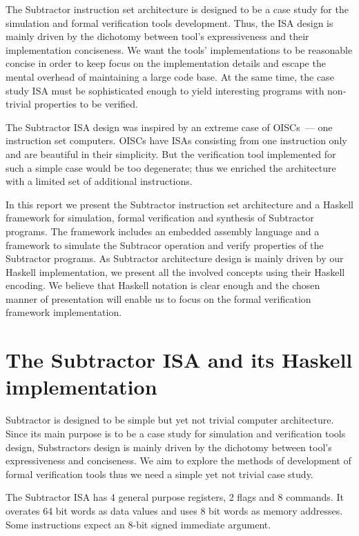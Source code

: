 The Subtractor instruction set architecture is designed to be a case study for
the simulation and formal verification tools development. Thus, the ISA design is mainly driven by the dichotomy between tool's expressiveness and their implementation conciseness.
We want the tools' implementations to be reasonable concise in order to keep focus on the
implementation details and escape the mental overhead of maintaining a large code base. At the same time, the case study ISA must be sophisticated enough to
yield interesting programs with non-trivial properties to be verified.

The Subtractor ISA design was inspired by an extreme case of OISCs~--- one instruction set computers. OISCs have ISAs consisting from one instruction only and are beautiful in their simplicity. But the verification tool implemented for such a simple case would be too degenerate; thus we enriched the architecture with a limited set of additional instructions.

In this report we present the Subtractor instruction set architecture and a Haskell framework for simulation, formal verification and synthesis of Subtractor programs. The framework includes an embedded assembly language and a framework to simulate the Subtracor operation and verify properties of the Subtractor programs. As Subtractor architecture design is mainly driven by our Haskell implementation, we present all the involved concepts using their Haskell encoding. We believe that Haskell notation is clear enough and the chosen manner of presentation will enable us to focus on the formal verification framework implementation.

\section{The Subtractor ISA and its Haskell implementation}

Subtractor is designed to be simple but yet not trivial computer architecture. Since its main purpose is to be a case study for simulation and verification tools design, Substractors design is mainly driven by the dichotomy between tool's expressiveness and conciseness. We aim to explore the methods of development of formal verification tools thus we need a simple yet not trivial case study.

The Subtractor ISA has 4 general purpose registers, 2 flags and 8 commands. It overates 64 bit words as data values and uses 8 bit words as memory addresses. Some instructions expect an 8-bit signed immediate argument.

